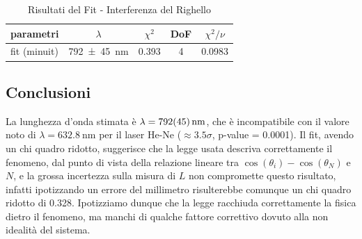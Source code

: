 \documentclass[a4paper]{article}
\begin{document}
\begin{table}[htbp]
\caption{Risultati del Fit - Interferenza del Righello}
\label{tab:interferenza-righello-risultati}
\centering
\begin{tabular}{|l|cccc|}
\hline
parametri & $\lambda$ & $\chi^2$ & DoF & $\chi^2/\nu$ \\\hline\hline
fit (minuit) & \SI{792 \pm 45}{\nano\meter} & \num{0.393} & 4 & \num{0.0983} \\\hline
\end{tabular}
\end{table}

\subsection{Conclusioni}
La lunghezza d'onda stimata è $\lambda = \SI{792 \pm 45}{\nano\meter}$, che è incompatibile con il valore noto di $\lambda = \SI{632.8}{\nano\meter}$ per il laser He-Ne ($\approx \num{3.5} \sigma$, p-value = \num{0.0001}). Il fit, avendo un chi quadro ridotto, suggerisce che la legge usata descriva correttamente il fenomeno, dal punto di vista della relazione lineare tra $\cos(\theta_i) - \cos(\theta_N)$ e $N$, e la grossa incertezza sulla misura di $L$ non compromette questo risultato, infatti ipotizzando un errore del millimetro risulterebbe comunque un chi quadro ridotto di \num{0.328}. Ipotizziamo dunque che la legge racchiuda correttamente la fisica dietro il fenomeno, ma manchi di qualche fattore correttivo dovuto alla non idealità del sistema. 
\end{document}
